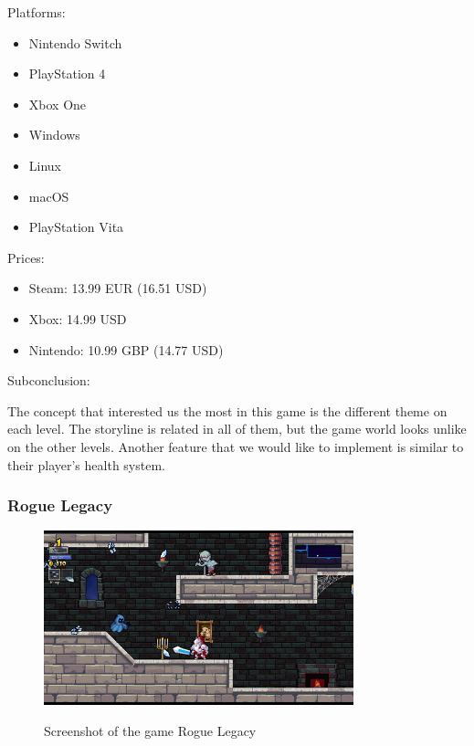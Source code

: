 \documentclass[12p]{article}
\begin{document}
\newpage

Platforms:

\begin{itemize}
  \item Nintendo Switch
  \item PlayStation 4
  \item Xbox One
  \item Windows
  \item Linux
  \item macOS
  \item PlayStation Vita
\end{itemize}

Prices:

\begin{itemize}
 \item Steam: 13.99 EUR (16.51 USD)
 \item Xbox: 14.99 USD
 \item Nintendo: 10.99 GBP (14.77 USD)
\end{itemize}

Subconclusion:

The concept that interested us the most in this game is the different theme on each level. The storyline is related in all of them, but the game world looks unlike on the other levels. Another feature that we would like to implement is similar to their player's health system.


\newpage
\subsubsection[Rogue Legacy]{Rogue Legacy \cite{RogueLegacy}}

\begin{figure}[ht]
 \center
 \includegraphics[width=0.8\textwidth]{StateOfTheArtScreenshots/rogue_legacy}
 \label{sec:StateOfTheArt_Screenshots_RogueLegacy}
 \caption{Screenshot of the game Rogue Legacy \cite{RogueLegacyScreenshot}}
\end{figure}
\end{document}
